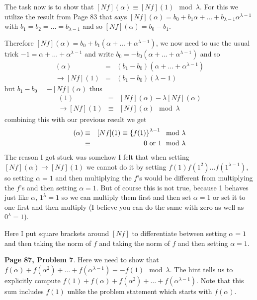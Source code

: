 \documentclass[aps,preprint,preprintnumbers,nofootinbib,showpacs,prd]{revtex4-1}
\newcommand{\nbea}{\begin{eqnarray*}}
\newcommand{\neea}{\end{eqnarray*}}
\begin{document}
The task now is to show that $[Nf](\alpha) \equiv [Nf](1) \mod{\lambda}$. For this we utilize the result from Page 83 that says $[Nf](\alpha) = b_0 + b_1\alpha + \dots + b_{\lambda-1}\alpha^{\lambda-1}$ with $b_1 = b_2 = \dots = b_{\lambda-1}$ and so $[Nf](\alpha) = b_0 - b_1$.

Therefore $[Nf](\alpha) = b_0 + b_1(\alpha + \dots + \alpha^{\lambda-1})$, we now need to use the usual trick $-1 = \alpha + \dots + \alpha^{\lambda-1}$ and write $b_0 = -b_0(\alpha + \dots + \alpha^{\lambda-1})$ and so
%
\nbea
[Nf](\alpha) & = & (b_1 - b_0)(\alpha + \dots + \alpha^{\lambda-1}) \\
\to [Nf](1) & = & (b_1 - b_0)(\lambda - 1)
\neea
%
but $b_1 - b_0 = -[Nf](\alpha)$ thus
%
\nbea
[Nf](1) & = & [Nf](\alpha) - \lambda[Nf](\alpha) \\
\to [Nf](1) & \equiv & [Nf](\alpha) \mod{\lambda}
\neea
%
combining this with our previous result we get
%
\nbea
[Nf](\alpha) & \equiv & [Nf](1) \equiv \left \{f(1)\right\}^{\lambda-1} \mod{\lambda} \\
& \equiv & 0 {\rm ~or~} 1 \mod{\lambda}
\neea
%
The reason I got stuck was somehow I felt that when setting $[Nf](\alpha) \to [Nf](1)$ we cannot do it by setting $f(1)f(1^2)\dots f(1^{\lambda-1})$, so setting $\alpha=1$ and then multiplying the $f$'s would be different from multiplying the $f$'s and then setting $\alpha = 1$. But of course this is not true, because 1 behaves just like $\alpha$, $1^\lambda = 1$ so we can multiply them first and then set $\alpha=1$ or set it to one first and then multiply (I believe you can do the same with zero as well as $0^{\lambda} = 1$).

Here I put square brackets around $[Nf]$ to differentiate between setting $\alpha=1$ and then taking the norm of $f$ and taking the norm of $f$ and then setting $\alpha=1$.

{\bf Page 87, Problem 7}. Here we need to show that $f(\alpha) + f(\alpha^2) + \dots + f(\alpha^{\lambda-1}) \equiv -f(1) \mod{\lambda}$. The hint tells us to explicitly compute $f(1) + f(\alpha) + f(\alpha^2) + \dots + f(\alpha^{\lambda-1})$. Note that this sum includes $f(1)$ unlike the problem statement which starts with $f(\alpha)$.
\end{document}
